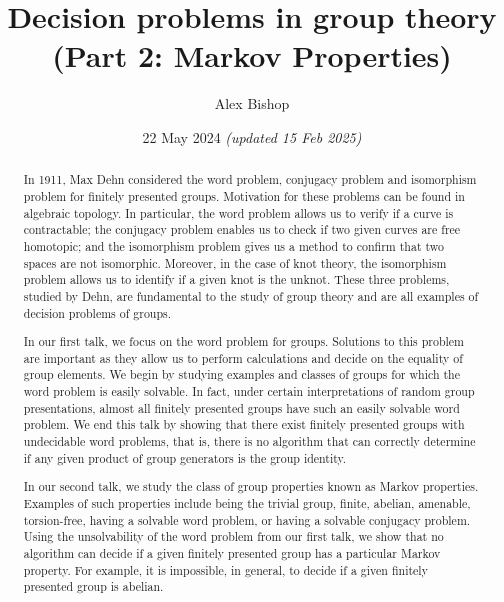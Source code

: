 \documentclass[11pt,a4paper,reqno]{amsart}
\theoremstyle{plain}
\theoremstyle{definition}
\theoremstyle{definition}
\begin{document}
\title{Decision problems in group theory\\(Part 2: Markov Properties)}
\author{Alex Bishop}
\date{22 May 2024 \textit{(updated 15 Feb 2025)}}
\address{%
	Section de mathématiques\\
	Université de Genève\\
	rue du Conseil-Général~7-9\\
	1205 Genève, Switzerland}

\begin{abstract}
	In 1911, Max Dehn considered the word problem, conjugacy problem and isomorphism problem for finitely presented groups. Motivation for these problems can be found in algebraic topology. In particular, the word problem allows us to verify if a curve is contractable; the conjugacy problem enables us to check if two given curves are free homotopic; and the isomorphism problem gives us a method to confirm that two spaces are not isomorphic. Moreover, in the case of knot theory, the isomorphism problem allows us to identify if a given knot is the unknot. These three problems, studied by Dehn, are fundamental to the study of group theory and are all examples of decision problems of groups.

	In our first talk, we focus on the word problem for groups. Solutions to this problem are important as they allow us to perform calculations and decide on the equality of group elements. We begin by studying examples and classes of groups for which the word problem is easily solvable. In fact, under certain interpretations of random group presentations, almost all finitely presented groups have such an easily solvable word problem. We end this talk by showing that there exist finitely presented groups with undecidable word problems, that is, there is no algorithm that can correctly determine if any given product of group generators is the group identity.

	In our second talk, we study the class of group properties known as Markov properties. Examples of such properties include being the trivial group, finite, abelian, amenable, torsion-free, having a solvable word problem, or having a solvable conjugacy problem. Using the unsolvability of the word problem from our first talk, we show that no algorithm can decide if a given finitely presented group has a particular Markov property. For example, it is impossible, in general, to decide if a given finitely presented group is abelian.
\end{abstract}
\maketitle
\end{document}
